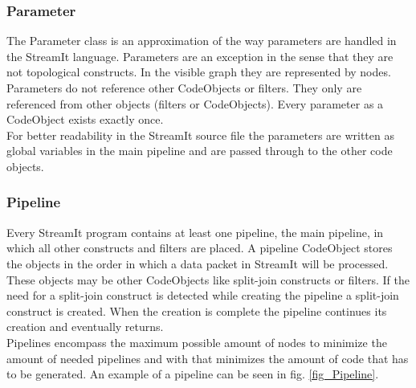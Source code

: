 \documentclass[journal]{IEEEtran}
\begin{document}
\subsubsection{Parameter}
\noindent The Parameter class is an approximation of the way parameters are
handled in the StreamIt language. Parameters are an exception in the sense that
they are not topological constructs. In the visible graph they are represented
by nodes. Parameters do not reference other CodeObjects or filters. They only
are referenced from other objects (filters or CodeObjects). Every parameter as a
CodeObject exists exactly once.\\
For better readability in the StreamIt source file the parameters are written as
global variables in the main pipeline and are passed through to the other code
objects.\\


\subsubsection{Pipeline}
\noindent Every StreamIt program contains at least one pipeline, the main
pipeline, in which all other constructs and filters are placed. A pipeline 
CodeObject stores the objects in the order in which a data packet in StreamIt 
will be processed. These objects may be other CodeObjects like split-join 
constructs or filters. If the need for a split-join construct is detected 
while creating the pipeline a split-join construct is created. When the 
creation is complete the pipeline continues its creation and eventually 
returns.\\
Pipelines encompass the maximum possible amount of nodes to minimize the 
amount of needed pipelines and with that minimizes the amount of code 
that has to be generated. An example of a pipeline can be seen in fig. 
\ref{fig_Pipeline}.\\
\end{document}

